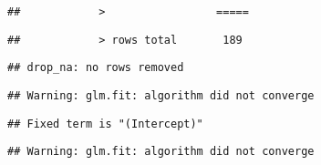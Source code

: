 \documentclass[
]{article}
\begin{document}
\begin{verbatim}
##            >                 =====
\end{verbatim}

\begin{verbatim}
##            > rows total       189
\end{verbatim}

\begin{verbatim}
## drop_na: no rows removed
\end{verbatim}

\begin{verbatim}
## Warning: glm.fit: algorithm did not converge
\end{verbatim}

\begin{verbatim}
## Fixed term is "(Intercept)"
\end{verbatim}

\begin{verbatim}
## Warning: glm.fit: algorithm did not converge
\end{verbatim}
\end{document}
